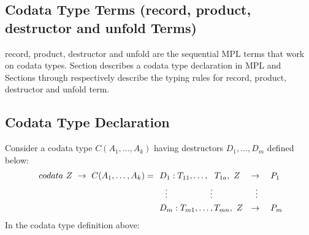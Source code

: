 \documentclass[11pt]{article}
\begin{document}
\subsection {Codata Type Terms (record, product, destructor and unfold Terms)}
{\sf record, product, destructor} and {\sf unfold} are the sequential MPL terms that work on codata types. Section describes a codata type declaration in MPL and Sections through respectively describe the typing rules for {\sf record, product, destructor} and {\sf unfold} term.

\subsection {Codata Type Declaration}\label{STypeInfer:CodataDefn}
Consider a codata type ${C(A_1,\ldots,A_k)}$ having destructors ${D_1,\ldots,D_m}$ defined below: 
\begin{align*} 
~codata~ Z ~\to~ C(A_1,\ldots,A_k) =
 & ~~ D_1 : T_{11},\ldots,~~ T_{1a},~Z ~~~\to ~~~ P_1 \\
 & ~~~~ \vdots \hskip 5em \vdots \hskip 5em \vdots \\ 
 & ~~ D_m : T_{m1},\ldots, T_{mn},~Z ~~\to ~~~ P_m
\end{align*}
In the codata type definition above:
\end{document}
